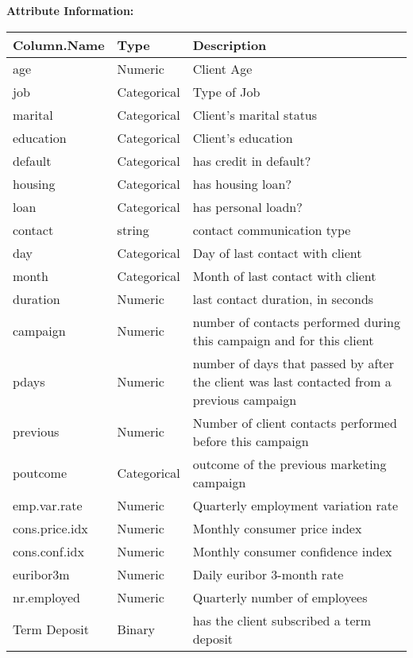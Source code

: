 \documentclass[
]{article}
\begin{document}
\textbf{Attribute Information:}

\begin{table}[H]
\centering
\begin{tabular}{l|l|l}
\hline
Column.Name & Type & Description\\
\hline
age & Numeric & Client Age\\
\hline
job & Categorical & Type of Job\\
\hline
marital & Categorical & Client’s marital status\\
\hline
education & Categorical & Client’s education\\
\hline
default & Categorical & has credit in default?\\
\hline
housing & Categorical & has housing loan?\\
\hline
loan & Categorical & has personal loadn?\\
\hline
contact & string & contact communication type\\
\hline
day & Categorical & Day of last contact with client\\
\hline
month & Categorical & Month of last contact with client\\
\hline
duration & Numeric & last contact duration, in seconds\\
\hline
campaign & Numeric & number of contacts performed during this campaign and for this client\\
\hline
pdays & Numeric & number of days that passed by after the client was last contacted from a previous campaign\\
\hline
previous & Numeric & Number of client contacts performed before this campaign\\
\hline
poutcome & Categorical & outcome of the previous marketing campaign\\
\hline
emp.var.rate & Numeric & Quarterly employment variation rate\\
\hline
cons.price.idx & Numeric & Monthly consumer price index\\
\hline
cons.conf.idx & Numeric & Monthly consumer confidence index\\
\hline
euribor3m & Numeric & Daily euribor 3-month rate\\
\hline
nr.employed & Numeric & Quarterly number of employees\\
\hline
Term Deposit & Binary & has the client subscribed a term deposit\\
\hline
\end{tabular}
\end{table}
\end{document}
